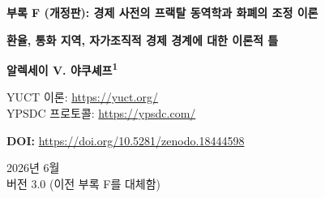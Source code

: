 \documentclass[12pt,a4paper]{article}
\theoremstyle{remark}
\begin{document}
	
	\begin{titlepage}
		\centering
		\vspace*{1cm}
		
		\Huge\textbf{부록 F (개정판): 경제 사전의 프랙탈 동역학과 화폐의 조정 이론}
		
		\vspace{0.5cm}
		\Large\textbf{환율, 통화 지역, 자가조직적 경제 경계에 대한 이론적 틀}
		
		\vspace{1.5cm}
		
		\Large\textbf{알렉세이 V. 야쿠셰프\textsuperscript{1}}
		
		YUCT 이론: \url{https://yuct.org/}\\
		YPSDC 프로토콜: \url{https://ypsdc.com/}
		
		\vspace{2cm}
		\textbf{DOI:} \url{https://doi.org/10.5281/zenodo.18444598}
		
		\vspace{1cm}
		
		\large
		2026년 6월 \\ \large 버전 3.0 (이전 부록 F를 대체함)
		
		\vspace{2cm}
		
		\begin{minipage}{0.9\textwidth}
			\begin{abstract}
				\noindent
				본 부록은 경제 분야에 대한 YUCT 접근법의 근본적인 재검토를 제시합니다. 우리는 이전의 모든 실증적 피팅 시도(예: GDP 또는 시장 변동성을 보편 지수 \(\beta = 0.67\)에 맞추려는 시도)를 포기하고, 대신 조정 존재론에 기반한 최초 원리로부터의 이론적 틀을 개발합니다. 경제는 상호작용하는 \textbf{경제 사전}(기업, 부문, 국가)의 네트워크로 모델링되며, 각 사전은 조정 효율성 \(K_{\mathrm{eff}}\)으로 특성화됩니다. 우리는 임의의 두 사전 사이의 경계가 만델브로트 집합과 유사한 프랙탈 동역학을 보임을 보여줍니다: 자기유사성, 복잡성, 그리고 보편 오차 법칙 \(\varepsilon = \kappa_c \alpha K_{\mathrm{eff}}^{-\beta}\)에 의해 지배됩니다. 화폐는 사전 경계를 가로지르는 활성화를 규제하는 \textbf{조정 매개변수}로 정의됩니다; 따라서 환율은 조정 효율성의 비율에 의해 결정됩니다. 이 틀은 몇 가지 정량적이고 반증 가능한 예측을 제공합니다: (1) 고주파 환율 시계열의 허스트 지수는 긴 시간 척도에서 \(H \approx 1/\beta \approx 1.5\)로 수렴해야 합니다; (2) 금융 수익률의 다중프랙탈 스펙트럼은 1차 대수 순환에 의해 결정되는 보편적 좌측 비대칭성을 보여야 합니다; (3) 환율의 변동성 \(\sigma\)는 두 사전 사이의 조정 간극 \(\Delta K_{\mathrm{eff}}\)에 대해 \(\sigma \propto (\Delta K_{\mathrm{eff}})^{-0.67}\)으로 스케일링됩니다. 본 부록에서는 실증적 피팅이 수행되지 않으며; 모든 예측은 경제 시스템에서 \(K_{\mathrm{eff}}\)에 대한 신뢰할 수 있는 프록시가 제공되면 테스트할 수 있는 형태로 공식화됩니다. 이 작업은 YUCT 경제학을 의심스러운 상관관계의 모음에서 엄격하고 반증 가능한 연구 프로그램으로 전환시킵니다.
			\end{abstract}
		\end{minipage}
		

\end{titlepage}
\end{document}
